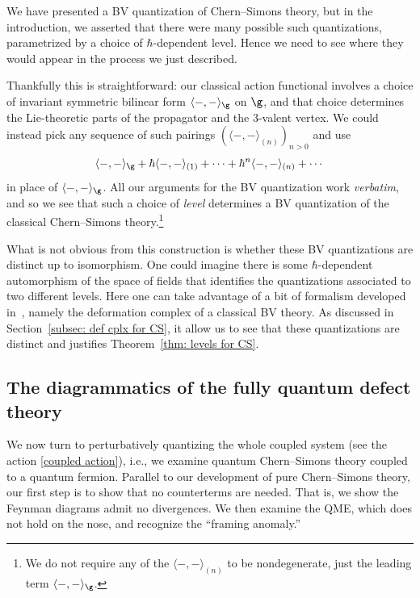 \documentclass[10pt]{amsart}
\begin{document}
\subsubsection{}

We have presented a BV quantization of Chern--Simons theory, 
but in the introduction, we asserted that there were many possible such quantizations,
parametrized by a choice of $\hbar$-dependent level.
Hence we need to see where they would appear in the process we just described.

Thankfully this is straightforward:
our classical action functional involves a choice of invariant symmetric bilinear form $\langle-,-\rangle_\g$ on $\g$,
and that choice determines the Lie-theoretic parts of the propagator and the 3-valent vertex.
We could instead pick any sequence of such pairings $(\langle-,-\rangle_{(n)})_{n > 0}$ and use
\[
\langle-,-\rangle_\g + \hbar \langle-,-\rangle_{(1)} + \cdots + \hbar^n \langle-,-\rangle_{(n)} + \cdots
\]
in place of $\langle-,-\rangle_\g$.
All our arguments for the BV quantization work {\it verbatim}, 
and so we see that such a choice of {\em level} determines a BV quantization of the classical Chern--Simons theory.\footnote{We do not require any of the $\langle-,-\rangle_{(n)}$ to be nondegenerate, 
just the leading term $\langle-,-\rangle_\g$.}

What is not obvious from this construction is whether these BV quantizations are distinct up to isomorphism.
One could imagine there is some $\hbar$-dependent automorphism of the space of fields that identifies the quantizations associated to two different levels.
Here one can take advantage of a bit of formalism developed in~\cite{CosBook},
namely the deformation complex of a classical BV theory.
As discussed in Section~\ref{subsec: def cplx for CS}, it allow us to see that these quantizations are distinct and justifies Theorem~\ref{thm: levels for CS}.

\subsection{The diagrammatics of the fully quantum defect theory}
\label{subsec: defect diagrams}

We now turn to perturbatively quantizing the whole coupled system (see the action \eqref{coupled action}),
i.e., we examine quantum Chern--Simons theory coupled to a quantum fermion.
Parallel to our development of pure Chern--Simons theory,
our first step is to show that no counterterms are needed.
That is, we show the Feynman diagrams admit no divergences.
We then examine the QME, which does not hold on the nose,
and recognize the ``framing anomaly.''
\end{document}
